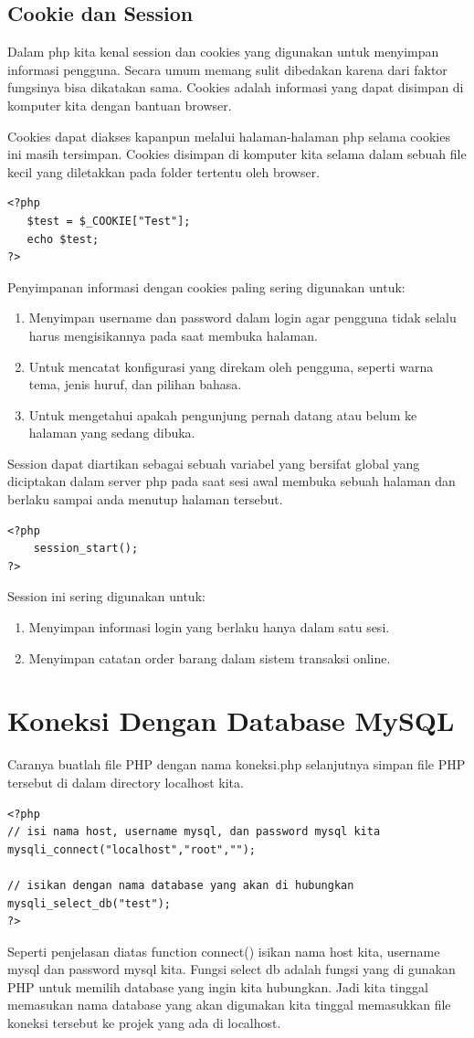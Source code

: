 \subsection{Cookie dan Session}
Dalam php kita kenal session dan cookies yang digunakan untuk menyimpan informasi pengguna. Secara umum memang sulit dibedakan karena dari faktor fungsinya bisa dikatakan sama. Cookies adalah informasi yang dapat disimpan di komputer kita dengan bantuan browser. 
\par 
Cookies dapat diakses kapanpun melalui halaman-halaman php selama cookies ini masih tersimpan. Cookies disimpan di komputer kita selama dalam sebuah file kecil yang diletakkan pada folder tertentu oleh browser. 
\begin{lstlisting}
<?php
   $test = $_COOKIE["Test"];
   echo $test;
?> 
\end{lstlisting}
Penyimpanan informasi dengan cookies paling sering digunakan untuk:
\begin{enumerate}
\item Menyimpan username dan password dalam login agar pengguna tidak selalu harus mengisikannya pada saat membuka halaman.
\item Untuk mencatat konfigurasi yang direkam oleh pengguna, seperti warna tema, jenis huruf, dan pilihan bahasa.
\item Untuk mengetahui apakah pengunjung pernah datang atau belum ke halaman yang sedang dibuka.
\end{enumerate}
Session dapat diartikan sebagai sebuah variabel yang bersifat global yang diciptakan dalam server php pada saat sesi awal membuka sebuah halaman dan berlaku sampai anda menutup halaman tersebut.
\begin{lstlisting}
<?php
    session_start();
?> 
\end{lstlisting}
Session ini sering digunakan untuk:
\begin{enumerate}
\item Menyimpan informasi login yang berlaku hanya dalam satu sesi.
\item Menyimpan catatan order barang dalam sistem transaksi online.
\end{enumerate}

\section{Koneksi Dengan Database MySQL}
Caranya buatlah file PHP dengan nama koneksi.php selanjutnya simpan file PHP tersebut di dalam directory localhost kita.
\begin{lstlisting}
<?php 
// isi nama host, username mysql, dan password mysql kita
mysqli_connect("localhost","root","");
 
// isikan dengan nama database yang akan di hubungkan
mysqli_select_db("test");
?>
\end{lstlisting}
Seperti penjelasan diatas function connect() isikan nama host kita, username mysql dan password mysql kita. Fungsi select db adalah fungsi yang di gunakan PHP untuk memilih database yang ingin kita hubungkan. Jadi kita tinggal memasukan nama database yang akan digunakan kita tinggal memasukkan file koneksi tersebut ke projek yang ada di localhost. 